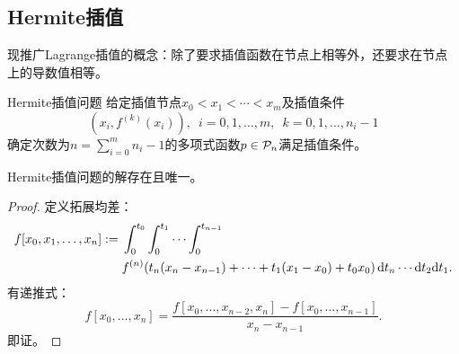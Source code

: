 \subsection{Hermite插值}

现推广Lagrange插值的概念：除了要求插值函数在节点上相等外，还要求在节点上的导数值相等。

\begin{definition}
    {Hermite插值问题}{}
    给定插值节点$x_0<x_1<\cdots<x_m$及插值条件
    \[
        (x_i,f^{(k)}(x_i)),\enspace i=0,1,\ldots,m,\enspace k=0,1,\ldots,n_i-1
    \]
    确定次数为$n=\sum_{i=0}^mn_i-1$的多项式函数$p\in\mathcal P_n$满足插值条件。
\end{definition}

\begin{theorem}
    {}{}
    Hermite插值问题的解存在且唯一。
\end{theorem}

\begin{proof}
    定义拓展均差：
    \begin{equation}
        \begin{aligned}
            f[x_0,x_1,\ldots,x_n]:={}&\int_0^{t_0}\int_0^{t_1}\cdots\int_0^{t_{n-1}}\\
            &f^{(n)}(t_n(x_n-x_{n-1})+\cdots+t_1(x_1-x_0)+t_0x_0)\mathop{}\!\mathrm{d} t_n\cdots\mathrm{d} t_2\mathrm{d} t_1.
        \end{aligned}
    \end{equation}
    有递推式：
    \begin{equation}
        f[x_0,\ldots,x_n]=\frac{f[x_0,\ldots,x_{n-2},x_n]-f[x_0,\ldots,x_{n-1}]}{x_n-x_{n-1}}.
    \end{equation}
    即证。
\end{proof}



